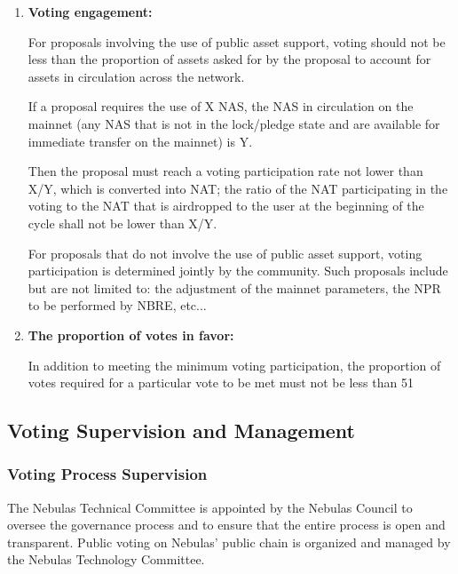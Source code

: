 \begin{enumerate}
	\item 

	\textbf{Voting engagement:}

	For proposals involving the use of public asset support, voting should not be less than the proportion of assets asked for by the proposal to account for assets in circulation across the network.

	If a proposal requires the use of X NAS, the NAS in circulation on the mainnet (any NAS that is not in the lock/pledge state and are available for immediate transfer on the mainnet) is Y.

	Then the proposal must reach a voting participation rate not lower than X/Y, which is converted into NAT; the ratio of the NAT participating in the voting to the NAT that is airdropped to the user at the beginning of the cycle shall not be lower than X/Y.

	For proposals that do not involve the use of public asset support, voting participation is determined jointly by the community. Such proposals include but are not limited to: the adjustment of the mainnet parameters, the NPR to be performed by NBRE, etc...

	\item

	\textbf{The proportion of votes in favor:}

	In addition to meeting the minimum voting participation, the proportion of votes required for a particular vote to be met must not be less than 51%
	
\end{enumerate}

\subsection{Voting Supervision and Management}

\subsubsection{Voting Process Supervision}
\label{second-vote}

The Nebulas Technical Committee is appointed by the Nebulas Council to oversee the governance process and to ensure that the entire process is open and transparent. Public voting on Nebulas' public chain is organized and managed by the Nebulas Technology Committee.

